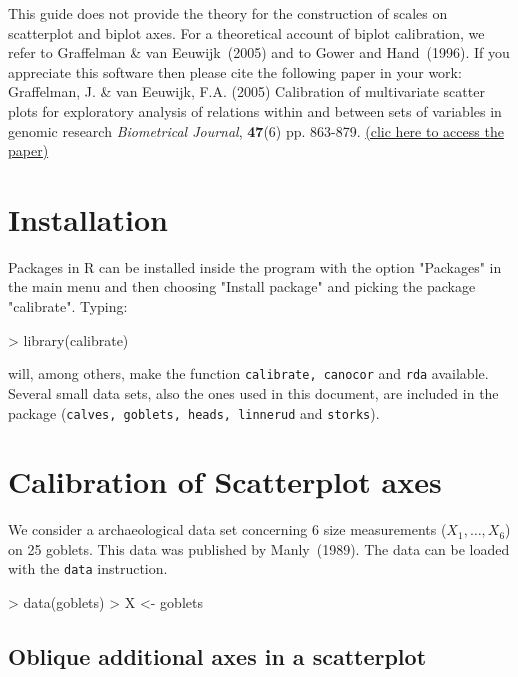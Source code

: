 \documentclass[a4paper]{article}
\begin{document}
This guide does not provide the theory for the construction of scales on scatterplot
and biplot axes. For a theoretical account of biplot calibration, we refer to Graffelman
\& van Eeuwijk~(2005) and to Gower and Hand~(1996). If you appreciate 
this software then please cite the following paper in your work:\\

Graffelman, J. \& van Eeuwijk, F.A. (2005) Calibration of multivariate scatter plots for 
exploratory analysis of relations within and between sets of variables in genomic research
{\it Biometrical Journal}, {\bf 47}(6) pp. 863-879. \href{http://dx.doi.org/10.1002/bimj.200510177}{(clic here to access the paper)}

\section{Installation}
\label{sec:install}


Packages in R can be installed inside the program with the option "Packages"
in the main menu and then choosing "Install package" and picking the package
"calibrate". Typing:

\begin{Schunk}
\begin{Sinput}
> library(calibrate)
\end{Sinput}
\end{Schunk}

will, among others, make the function {\tt calibrate, canocor} and {\tt rda} available. Several
small data sets, also the ones used in this document, are included in the package ({\tt calves, goblets,
heads, linnerud} and {\tt storks}).

\section{Calibration of Scatterplot axes}
\label{sec:scatter}

We consider a archaeological data set concerning 6 size measurements ($X_1, \ldots, X_6$) on 25 
goblets. This data was published by Manly~(1989). The data can be loaded with
the {\tt data} instruction. 
\begin{Schunk}
\begin{Sinput}
> data(goblets)
> X <- goblets
\end{Sinput}
\end{Schunk}

\subsection*{Oblique additional axes in a scatterplot}
\end{document}
